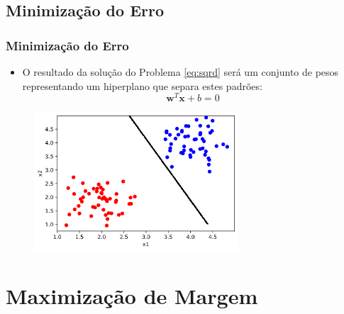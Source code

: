 \documentclass{beamer}
\begin{document}
\subsection{Minimização do Erro}

\begin{frame}
	\frametitle{Minimização do Erro}
	\begin{itemize}
		\item O resultado da solução do Problema \ref{eq:sqrd} será um conjunto de pesos representando um hiperplano que separa estes padrões:
		\begin{equation}
	 		\textbf{w}^T\textbf{x} + b = 0
	 		\label{eq:plano}
 		\end{equation}
	\end{itemize}
	\begin{figure}[h!]
		\centering
		\includegraphics[width=3.0in]{fig01.png}
		\label{fig:plano-mse}
	\end{figure}
\end{frame}

\section{Maximização de Margem}
\end{document}
